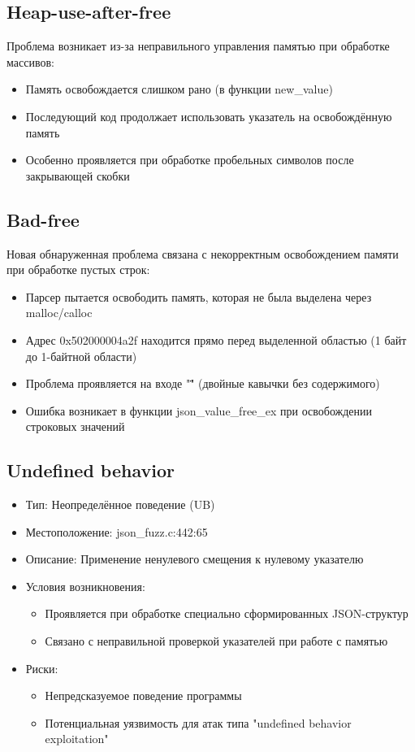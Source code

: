    \subsection{Heap-use-after-free}
    Проблема возникает из-за неправильного управления памятью при обработке массивов:
    \begin{itemize}
        \item Память освобождается слишком рано (в функции new\_value)
        \item Последующий код продолжает использовать указатель на освобождённую память
        \item Особенно проявляется при обработке пробельных символов после закрывающей скобки
    \end{itemize}

    \subsection{Bad-free}
    Новая обнаруженная проблема связана с некорректным освобождением памяти при обработке пустых строк:
    \begin{itemize}
        \item Парсер пытается освободить память, которая не была выделена через malloc/calloc
        \item Адрес 0x502000004a2f находится прямо перед выделенной областью (1 байт до 1-байтной области)
        \item Проблема проявляется на входе "\"\"" (двойные кавычки без содержимого)
        \item Ошибка возникает в функции json\_value\_free\_ex при освобождении строковых значений
    \end{itemize}

    \subsection{Undefined behavior}
    \begin{itemize}
        \item Тип: Неопределённое поведение (UB)
        \item Местоположение: json\_fuzz.c:442:65
        \item Описание: Применение ненулевого смещения к нулевому указателю
        \item Условия возникновения:
        \begin{itemize}
            \item Проявляется при обработке специально сформированных JSON-структур
            \item Связано с неправильной проверкой указателей при работе с памятью
        \end{itemize}
        \item Риски:
        \begin{itemize}
            \item Непредсказуемое поведение программы
            \item Потенциальная уязвимость для атак типа "undefined behavior exploitation"
        \end{itemize}
    \end{itemize}

